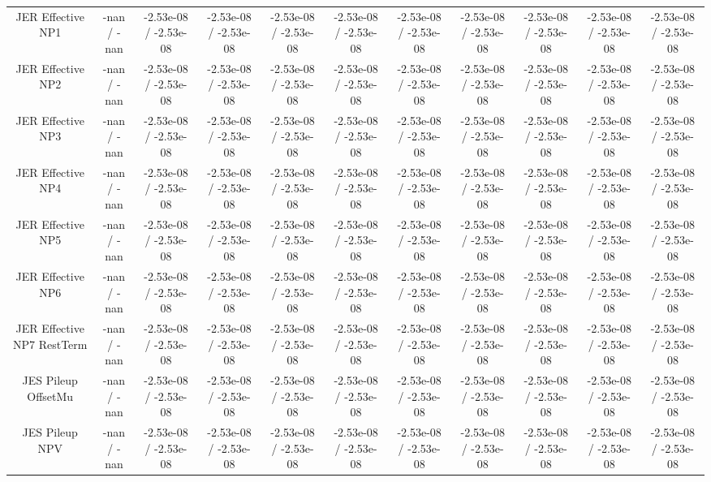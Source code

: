 \begin{table}[htbp]
\begin{center}
\begin{tabular}{|c|c|c|c|c|c|c|c|c|c|c|}
  JER Effective NP1 & -nan / -nan & -2.53e-08 / -2.53e-08 & -2.53e-08 / -2.53e-08 & -2.53e-08 / -2.53e-08 & -2.53e-08 / -2.53e-08 & -2.53e-08 / -2.53e-08 & -2.53e-08 / -2.53e-08 & -2.53e-08 / -2.53e-08 & -2.53e-08 / -2.53e-08 & -2.53e-08 / -2.53e-08 \\ 
  JER Effective NP2 & -nan / -nan & -2.53e-08 / -2.53e-08 & -2.53e-08 / -2.53e-08 & -2.53e-08 / -2.53e-08 & -2.53e-08 / -2.53e-08 & -2.53e-08 / -2.53e-08 & -2.53e-08 / -2.53e-08 & -2.53e-08 / -2.53e-08 & -2.53e-08 / -2.53e-08 & -2.53e-08 / -2.53e-08 \\ 
  JER Effective NP3 & -nan / -nan & -2.53e-08 / -2.53e-08 & -2.53e-08 / -2.53e-08 & -2.53e-08 / -2.53e-08 & -2.53e-08 / -2.53e-08 & -2.53e-08 / -2.53e-08 & -2.53e-08 / -2.53e-08 & -2.53e-08 / -2.53e-08 & -2.53e-08 / -2.53e-08 & -2.53e-08 / -2.53e-08 \\ 
  JER Effective NP4 & -nan / -nan & -2.53e-08 / -2.53e-08 & -2.53e-08 / -2.53e-08 & -2.53e-08 / -2.53e-08 & -2.53e-08 / -2.53e-08 & -2.53e-08 / -2.53e-08 & -2.53e-08 / -2.53e-08 & -2.53e-08 / -2.53e-08 & -2.53e-08 / -2.53e-08 & -2.53e-08 / -2.53e-08 \\ 
  JER Effective NP5 & -nan / -nan & -2.53e-08 / -2.53e-08 & -2.53e-08 / -2.53e-08 & -2.53e-08 / -2.53e-08 & -2.53e-08 / -2.53e-08 & -2.53e-08 / -2.53e-08 & -2.53e-08 / -2.53e-08 & -2.53e-08 / -2.53e-08 & -2.53e-08 / -2.53e-08 & -2.53e-08 / -2.53e-08 \\ 
  JER Effective NP6 & -nan / -nan & -2.53e-08 / -2.53e-08 & -2.53e-08 / -2.53e-08 & -2.53e-08 / -2.53e-08 & -2.53e-08 / -2.53e-08 & -2.53e-08 / -2.53e-08 & -2.53e-08 / -2.53e-08 & -2.53e-08 / -2.53e-08 & -2.53e-08 / -2.53e-08 & -2.53e-08 / -2.53e-08 \\ 
  JER Effective NP7 RestTerm & -nan / -nan & -2.53e-08 / -2.53e-08 & -2.53e-08 / -2.53e-08 & -2.53e-08 / -2.53e-08 & -2.53e-08 / -2.53e-08 & -2.53e-08 / -2.53e-08 & -2.53e-08 / -2.53e-08 & -2.53e-08 / -2.53e-08 & -2.53e-08 / -2.53e-08 & -2.53e-08 / -2.53e-08 \\ 
  JES Pileup OffsetMu & -nan / -nan & -2.53e-08 / -2.53e-08 & -2.53e-08 / -2.53e-08 & -2.53e-08 / -2.53e-08 & -2.53e-08 / -2.53e-08 & -2.53e-08 / -2.53e-08 & -2.53e-08 / -2.53e-08 & -2.53e-08 / -2.53e-08 & -2.53e-08 / -2.53e-08 & -2.53e-08 / -2.53e-08 \\ 
  JES Pileup NPV & -nan / -nan & -2.53e-08 / -2.53e-08 & -2.53e-08 / -2.53e-08 & -2.53e-08 / -2.53e-08 & -2.53e-08 / -2.53e-08 & -2.53e-08 / -2.53e-08 & -2.53e-08 / -2.53e-08 & -2.53e-08 / -2.53e-08 & -2.53e-08 / -2.53e-08 & -2.53e-08 / -2.53e-08 \\ 

\end{tabular}
\end{center}
\end{table}
